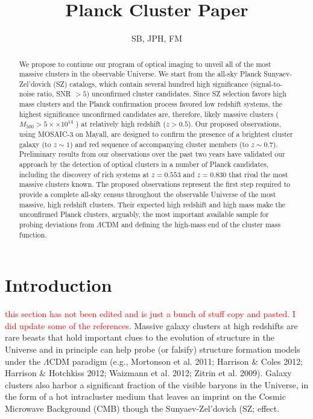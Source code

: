 \documentclass[apj, revtex4]{emulateapj}
\newcommand{\editorial}[1]{\textcolor{red}{#1}}
\begin{document}
	
\title{Planck Cluster Paper}
	
\author{\sc SB, JPH, FM} 
	


\begin{abstract}
	\noindent We propose to continue our program of optical imaging to unveil all of the most massive clusters in
	the observable Universe. We start from the all-sky Planck Sunyaev-Zel’dovich (SZ) catalogs, which contain several hundred high significance (signal-to-noise ratio, SNR $> 5$) unconfirmed cluster candidates. Since SZ selection favors high mass clusters and the Planck confirmation process favored	low redshift systems, the highest significance unconfirmed candidates are, therefore, likely massive clusters ($M_{500} > 5 ×\times 10^{14}$ \Msol) at relatively high redshift ($z > 0.5$). Our proposed observations,	using MOSAIC-3 on Mayall, are designed to confirm the presence of a brightest cluster galaxy (to $z \sim 1$) and red sequence of accompanying cluster members (to $z \sim 0.7$). Preliminary results from our observations over the past two years have validated our approach by the detection of optical clusters in a number of Planck candidates, including the discovery of rich systems at $z = 0.553$ and $z = 0.830$ that rival the most massive clusters known. The proposed observations represent the first step required to provide a complete all-sky census throughout the observable Universe of the most massive, high redshift clusters. Their expected high redshift and high mass make the unconfirmed Planck clusters, arguably, the most important available sample for probing deviations from $\Lambda$CDM and defining the high-mass end of the cluster mass function.
\end{abstract}

\section{Introduction}
\editorial{this section has not been edited and is just a bunch of stuff copy and pasted. I did update some of the references.}
Massive galaxy clusters at high redshifts are rare beasts that hold important clues to the evolution of structure in the Universe and in principle can help probe (or falsify) structure formation models under the $\Lambda$CDM paradigm (e.g., Mortonson et al. 2011; Harrison \& Coles 2012; Harrison \& Hotchkiss 2012; Waizmann et al. 2012; Zitrin et al. 2009). Galaxy clusters also harbor a significant fraction of the visible baryons in the Universe, in the form of a hot intracluster medium that leaves an imprint on the Cosmic Microwave Background (CMB) though the Sunyaev-Zel'dovich (SZ; \citealt{Sunyaev1972} effect. 
\end{document}
